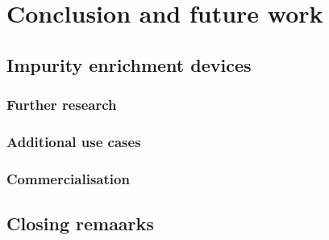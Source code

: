 \chapter{Conclusion and future work}

\section{Impurity enrichment devices}
\subsection{Further research}
\subsection{Additional use cases}
\subsection{Commercialisation}

\section{Closing remaarks}



% 
% 